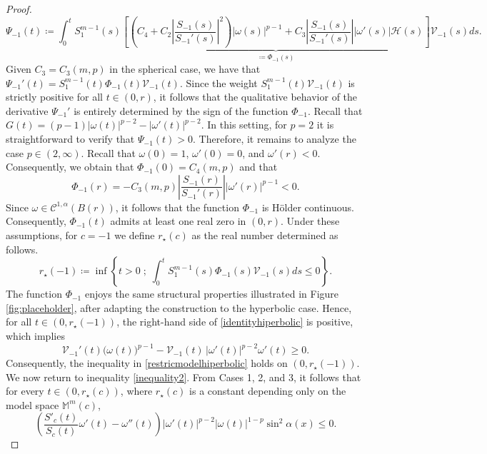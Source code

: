 \documentclass{article}
\begin{document}
\begin{proof}
\begin{equation*}
       \Psi_{-1}(t) \coloneq \int_{0}^{t}  S_1^{m-1}(s)  \underbrace{ \left[ \left( C_4 + C_2\left|\frac{S_{-1}(s)}{S_{-1}'(s)}\right|^2\right) |\omega(s)|^{p-1} + C_3\left|\frac{S_{-1}(s)}{S_{-1}'(s)}\right| |\omega'(s)| \mathcal{H}(s) \right]}_{\coloneq \Phi_{-1}(s)}\mathcal{V}_{-1}(s)ds. 
\end{equation*}
Given $C_3 = C_3(m,p)$ in the spherical case, we have that $\Psi_{-1}'(t) = S_1^{m-1}(t)\Phi_{-1}(t)\mathcal{V}_{-1}(t)$. Since the weight $S_1^{m-1}(t)\mathcal{V}_{-1}(t)$ is strictly positive for all $t \in (0,r)$, it follows that the qualitative behavior of the derivative $\Psi_{-1}'$ is entirely determined by the sign of the function $\Phi_{-1}$. Recall that $G(t) = (p-1)|\omega(t)|^{p-2} - |\omega'(t)|^{p-2}$. In this setting, for $p=2$ it is straightforward to verify that $\Psi_{-1}(t)>0$. Therefore, it remains to analyze the case $p\in(2,\infty)$. Recall that $\omega(0)=1$, $\omega'(0)=0$, and $\omega'(r)<0$. Consequently, we obtain that $\Phi_{-1}(0)=C_4(m,p)$ and that
\[\Phi_{-1}(r)= -C_3(m,p) \left| \frac{S_{-1}(r)}{S_{-1}'(r)} \right||\omega'(r)|^{p-1}<0.\]
Since $\omega \in \mathcal{C}^{1,\alpha}(B(r))$, it follows that the function $\Phi_{-1}$ is H\"older continuous. Consequently, $\Phi_{-1}(t)$ admits at least one real zero in $(0,r)$. Under these assumptions, for $c=-1$ we define $r_\star(c)$ as the real number determined as follows.
\begin{equation}
r_\star(-1) \coloneq \inf \left\{ t>0 \; ; \; \int_{0}^{t} S_1^{m-1}(s) \Phi_{-1}(s) \mathcal{V}_{-1}(s) ds \leq 0 \right\}.
\end{equation}
The function $\Phi_{-1}$ enjoys the same structural properties illustrated in Figure \eqref{fig:placeholder}, after adapting the construction to the hyperbolic case. Hence, for all $t \in (0,r_\star(-1))$, the right-hand side of \eqref{identityhiperbolic} is positive, which implies
\[
\mathcal{V}_{-1}'(t)\bigl(\omega(t)\bigr)^{p-1}
-\mathcal{V}_{-1}(t)\,|\omega'(t)|^{p-2}\omega'(t)
\ge 0.
\]
Consequently, the inequality in \eqref{restricmodelhiperbolic} holds on $(0,r_\star(-1))$. We now return to inequality \eqref{inequality2}. From Cases 1, 2, and 3, it follows that for every $t \in (0,r_\star(c))$, where $r_\star(c)$ is a constant depending only on the model space $\mathbb{M}^m(c)$,
\begin{equation*}
\left( \frac{S'_c(t)}{S_c(t)}\omega'(t) - \omega''(t) \right)  |\omega'(t)|^{p-2} |\omega(t)|^{1-p} \sin^2\! \alpha(x) \leq 0.
\end{equation*}

\end{proof}
\end{document}
